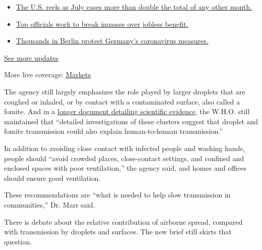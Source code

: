 \begin{itemize}
\tightlist
\item
  \href{https://www.nytimes.com/2020/08/01/world/coronavirus-covid-19.html?action=click\&pgtype=Article\&state=default\&region=MAIN_CONTENT_1\&context=storylines_live_updates\#link-34047410}{The
  U.S. reels as July cases more than double the total of any other
  month.}
\item
  \href{https://www.nytimes.com/2020/08/01/world/coronavirus-covid-19.html?action=click\&pgtype=Article\&state=default\&region=MAIN_CONTENT_1\&context=storylines_live_updates\#link-3ac56579}{Top
  officials work to break impasse over jobless benefit.}
\item
  \href{https://www.nytimes.com/2020/08/01/world/coronavirus-covid-19.html?action=click\&pgtype=Article\&state=default\&region=MAIN_CONTENT_1\&context=storylines_live_updates\#link-25930521}{Thousands
  in Berlin protest Germany's coronavirus measures.}
\end{itemize}

\href{https://www.nytimes.com/2020/08/01/world/coronavirus-covid-19.html?action=click\&pgtype=Article\&state=default\&region=MAIN_CONTENT_1\&context=storylines_live_updates}{See
more updates}

More live coverage:
\href{https://www.nytimes.com/live/2020/07/31/business/stock-market-today-coronavirus?action=click\&pgtype=Article\&state=default\&region=MAIN_CONTENT_1\&context=storylines_live_updates}{Markets}

The agency still largely emphasizes the role played by larger droplets
that are coughed or inhaled, or by contact with a contaminated surface,
also called a fomite. And in a
\href{https://www.who.int/publications/i/item/modes-of-transmission-of-virus-causing-covid-19-implications-for-ipc-precaution-recommendations}{longer
document detailing scientific evidence}, the W.H.O. still maintained
that ``detailed investigations of these clusters suggest that droplet
and fomite transmission could also explain human-to-human
transmission.''

In addition to avoiding close contact with infected people and washing
hands, people should ``avoid crowded places, close-contact settings, and
confined and enclosed spaces with poor ventilation,'' the agency said,
and homes and offices should ensure good ventilation.

These recommendations are ``what is needed to help slow transmission in
communities,'' Dr. Marr said.

There is debate about the relative contribution of airborne spread,
compared with transmission by droplets and surfaces. The new brief still
skirts that question.


